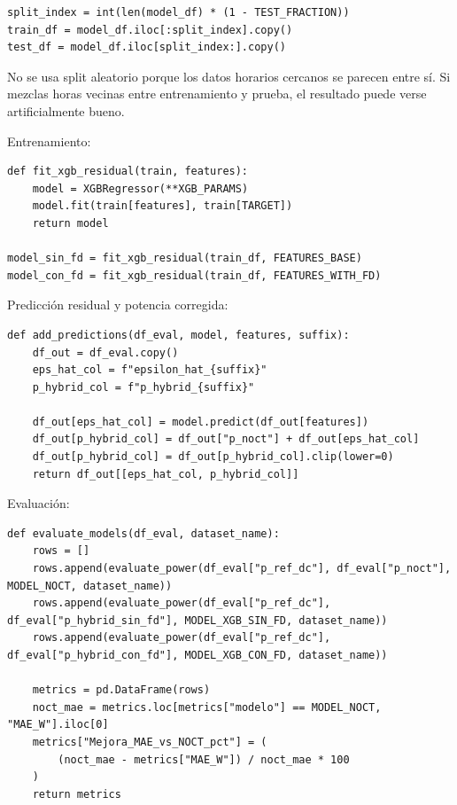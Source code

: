 \documentclass[11pt, letterpaper]{article}
\begin{document}
\begin{lstlisting}[style=pythonstyle]
split_index = int(len(model_df) * (1 - TEST_FRACTION))
train_df = model_df.iloc[:split_index].copy()
test_df = model_df.iloc[split_index:].copy()
\end{lstlisting}

No se usa split aleatorio porque los datos horarios cercanos se parecen entre s\'i. Si mezclas horas vecinas entre entrenamiento y prueba, el resultado puede verse artificialmente bueno.

Entrenamiento:

\begin{lstlisting}[style=pythonstyle]
def fit_xgb_residual(train, features):
    model = XGBRegressor(**XGB_PARAMS)
    model.fit(train[features], train[TARGET])
    return model

model_sin_fd = fit_xgb_residual(train_df, FEATURES_BASE)
model_con_fd = fit_xgb_residual(train_df, FEATURES_WITH_FD)
\end{lstlisting}

Predicci\'on residual y potencia corregida:

\begin{lstlisting}[style=pythonstyle]
def add_predictions(df_eval, model, features, suffix):
    df_out = df_eval.copy()
    eps_hat_col = f"epsilon_hat_{suffix}"
    p_hybrid_col = f"p_hybrid_{suffix}"

    df_out[eps_hat_col] = model.predict(df_out[features])
    df_out[p_hybrid_col] = df_out["p_noct"] + df_out[eps_hat_col]
    df_out[p_hybrid_col] = df_out[p_hybrid_col].clip(lower=0)
    return df_out[[eps_hat_col, p_hybrid_col]]
\end{lstlisting}

Evaluaci\'on:

\begin{lstlisting}[style=pythonstyle]
def evaluate_models(df_eval, dataset_name):
    rows = []
    rows.append(evaluate_power(df_eval["p_ref_dc"], df_eval["p_noct"], MODEL_NOCT, dataset_name))
    rows.append(evaluate_power(df_eval["p_ref_dc"], df_eval["p_hybrid_sin_fd"], MODEL_XGB_SIN_FD, dataset_name))
    rows.append(evaluate_power(df_eval["p_ref_dc"], df_eval["p_hybrid_con_fd"], MODEL_XGB_CON_FD, dataset_name))

    metrics = pd.DataFrame(rows)
    noct_mae = metrics.loc[metrics["modelo"] == MODEL_NOCT, "MAE_W"].iloc[0]
    metrics["Mejora_MAE_vs_NOCT_pct"] = (
        (noct_mae - metrics["MAE_W"]) / noct_mae * 100
    )
    return metrics
\end{lstlisting}
\end{document}
